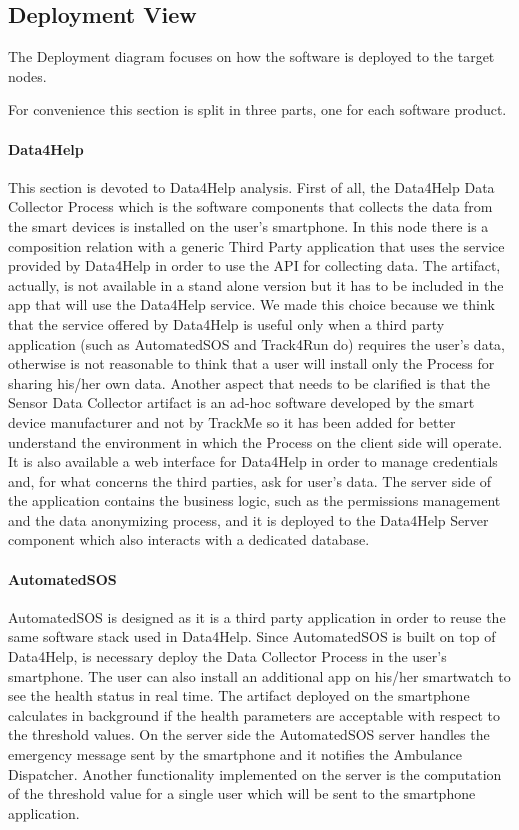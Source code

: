 \documentclass[a4paper]{article}
\begin{document}
\subsection{Deployment View}
The Deployment diagram focuses on how the software is deployed to the target nodes.

For convenience this section is split in three parts, one for each software product.

\paragraph{Data4Help}
This section is devoted to Data4Help analysis. First of all, the Data4Help Data Collector Process which is the software components that collects the data from the smart devices is installed on the user's smartphone. In this node there is a composition relation with a generic Third Party application that uses the service provided by Data4Help in order to use the API for collecting data. The artifact, actually, is not available in a stand alone version but it has to be included in the app that will use the Data4Help service. We made this choice because we think that the service offered by Data4Help is useful only when a third party application (such as AutomatedSOS and Track4Run do) requires the user's data, otherwise is not reasonable to think that a user will install only the Process for sharing his/her own data.
Another aspect that needs to be clarified is that the Sensor Data Collector artifact is an ad-hoc software developed by the smart device manufacturer and not by TrackMe so it has been added for better understand the environment in which the Process on the client side will operate.
It is also available a web interface for Data4Help in order to manage credentials and, for what concerns the third parties, ask for user's data.
The server side of the application contains the business logic, such as the permissions management and the data anonymizing process, and it is deployed to the Data4Help Server component which also interacts with a dedicated database.

\paragraph{AutomatedSOS}
AutomatedSOS is designed as it is a third party application in order to reuse the same software stack used in Data4Help. Since AutomatedSOS is built on top of Data4Help, is necessary deploy the Data Collector Process in the user's smartphone. The user can also install an additional app on his/her smartwatch to see the health status in real time. The artifact deployed on the smartphone calculates in background if the health parameters are acceptable with respect to the threshold values. On the server side the AutomatedSOS server handles the emergency message sent by the smartphone and it notifies the Ambulance Dispatcher. Another functionality implemented on the server is the computation of the threshold value for a single user which will be sent to the smartphone application.
\end{document}
